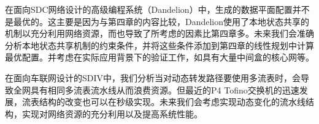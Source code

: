 在面向SDC网络设计的高级编程系统（Dandelion）中，生成的数据平面配置并不是最优的。这主要是因为与第四章的内容比较，Dandelion使用了本地状态共享的机制以充分利用网络资源，而也导致了所考虑的因素比第四章多。未来我们会准确分析本地状态共享机制的约束条件，并将这些条件添加到第四章的线性规划中计算最优配置。并考虑在实际应用背景下的验证工作，如具有大量中间盒的核心网等。

在面向车联网设计的SDIV中，我们分析当对动态转发路径要使用多流表时，会导致全网具有相同多流表流水线从而浪费资源。但最近的P4 Tofino交换机的迅速发展，流表结构的改变也可以在秒级实现。未来我们会考虑实现动态变化的流水线结构，实现对网络资源的充分利用以及提高系统性能。



%

